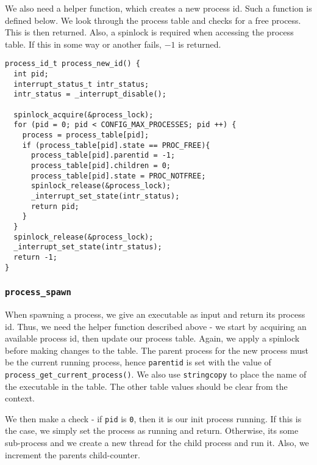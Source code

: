 \documentclass[a4paper,12pt]{article}
\begin{document}
We also need a helper function, which creates a new process id. Such a function is defined below. We look through the process table and checks for a free process. This is then returned. Also, a spinlock is required when accessing the process table. If this in some way or another fails, $-1$ is returned.
\begin{lstlisting}
process_id_t process_new_id() {
  int pid;
  interrupt_status_t intr_status;
  intr_status = _interrupt_disable();
  
  spinlock_acquire(&process_lock);
  for (pid = 0; pid < CONFIG_MAX_PROCESSES; pid ++) {
    process = process_table[pid];
    if (process_table[pid].state == PROC_FREE){
      process_table[pid].parentid = -1;
      process_table[pid].children = 0;
      process_table[pid].state = PROC_NOTFREE;
      spinlock_release(&process_lock);
      _interrupt_set_state(intr_status);
      return pid;
    }
  }
  spinlock_release(&process_lock);
  _interrupt_set_state(intr_status);
  return -1;
}
\end{lstlisting}

\subsubsection{\texttt{process\_spawn}}

When spawning a process, we give an executable as input and return its process id. Thus, we need the helper function described above - we start by acquiring an available process id, then update our process table. Again, we apply a spinlock before making changes to the table. The parent process for the new process must be the current running process, hence \texttt{parentid} is set with the value of \texttt{process\_get\_current\_process()}. We also use \texttt{stringcopy} to place the name of the executable in the table. The other table values should be clear from the context.

We then make a check - if \texttt{pid} is \texttt{0}, then it is our init process running. If this is the case, we simply set the process as running and return. Otherwise, its some sub-process and we create a new thread for the child process and run it. Also, we increment the parents child-counter.
\end{document}
